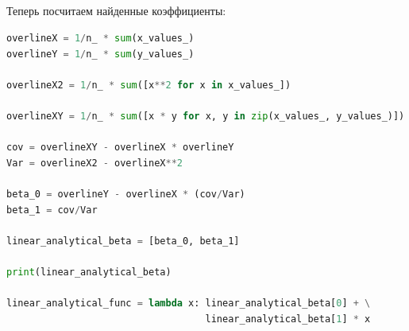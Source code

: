 \documentclass[a4paper, 14pt]{extarticle}
\begin{document}
\vfill\newpage

\begin{center}
     \\
\end{center}

\begin{center}
     \\
\end{center}

\begin{center}
     \\
\end{center}

\begin{center}
     \\
\end{center}

Теперь посчитаем найденные коэффициенты:

\begin{center}
    \begin{lstlisting}[language=Python]
overlineX = 1/n_ * sum(x_values_)
overlineY = 1/n_ * sum(y_values_)

overlineX2 = 1/n_ * sum([x**2 for x in x_values_])

overlineXY = 1/n_ * sum([x * y for x, y in zip(x_values_, y_values_)])

cov = overlineXY - overlineX * overlineY
Var = overlineX2 - overlineX**2

beta_0 = overlineY - overlineX * (cov/Var)
beta_1 = cov/Var

linear_analytical_beta = [beta_0, beta_1]

print(linear_analytical_beta)

linear_analytical_func = lambda x: linear_analytical_beta[0] + \
                                   linear_analytical_beta[1] * x
    \end{lstlisting}
\end{center}
\end{document}

